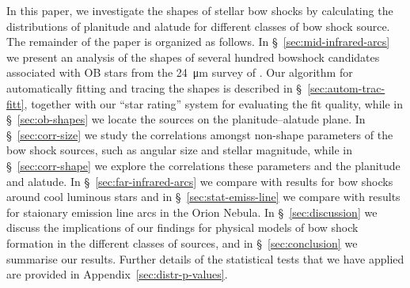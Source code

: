 In this paper, we investigate the shapes of stellar bow shocks by
calculating the distributions of planitude and alatude for different
classes of bow shock source.  The remainder of the paper is organized
as follows. In \S~\ref{sec:mid-infrared-arcs} we present an analysis
of the shapes of several hundred bowshock candidates associated with
OB stars from the \SI{24}{\um} survey of \citet{Kobulnicky:2016a}.
Our algorithm for automatically fitting and tracing the shapes is
described in \S~\ref{sec:autom-trac-fitt}, together with our ``star
rating'' system for evaluating the fit quality, while in
\S~\ref{sec:ob-shapes} we locate the sources on the planitude--alatude
plane.  In \S~\ref{sec:corr-size} we study the correlations amongst
non-shape parameters of the bow shock sources, such as angular size
and stellar magnitude, while in \S~\ref{sec:corr-shape} we explore the
correlations these parameters and the planitude and alatude.  In
\S~\ref{sec:far-infrared-arcs} we compare with results for bow shocks
around cool luminous stars and in \S~\ref{sec:stat-emiss-line} we
compare with results for staionary emission line arcs in the Orion
Nebula.  In \S~\ref{sec:discussion} we discuss the implications of our
findings for physical models of bow shock formation in the different
classes of sources, and in \S~\ref{sec:conclusion} we summarise our
results.  Further details of the statistical tests that we have
applied are provided in Appendix~\ref{sec:distr-p-values}.










